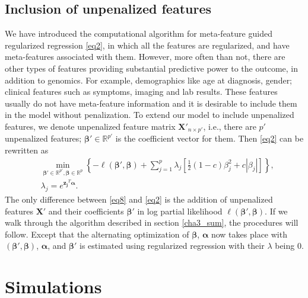 \subsection{Inclusion of unpenalized features}
We have introduced the computational algorithm for meta-feature guided regularized regression \eqref{eq2}, in which all the features are regularized, and have meta-features associated with them. However, more often than not, there are other types of features providing substantial predictive power to the outcome, in addition to genomics. For example, demographics like age at diagnosis, gender; clinical features such as symptoms, imaging and lab results. These features usually do not have meta-feature information and it is desirable to include them in the model without penalization. To extend our model to include unpenalized features, we denote unpenalized feature matrix $\bm{X}'_{n\times p'}$, i.e., there are $p'$ unpenalized features; $\bm{\beta}'\in \mathbb{R}^{p'}$ is the coefficient vector for them. Then \eqref{eq2} can be rewritten as
\begin{equation} \label{eq8}
\begin{aligned}
    &\min_{\bm{\beta}'\in \mathbb{R}^{p'}, \bm{\beta}\in \mathbb{R}^p} \left\{-\ell(\bm{\beta}', \bm{\beta}) + \sum_{j=1}^p \lambda_j\left[\frac{1}{2}(1-c)\beta_j^2 + c|\beta_j|\right]\right\}, \\
    &\lambda_j = e^{\bm{z_j}^T \bm{\alpha}}.
\end{aligned}
\end{equation}
The only difference between \eqref{eq8} and \eqref{eq2} is the addition of unpenalized features $\bm{X}'$ and their coefficients $\bm{\beta}'$ in log partial likelihood $\ell(\bm{\beta}', \bm{\beta})$. If we walk through the algorithm described in section \ref{cha3_sum}, the procedures will follow. Except that the alternating optimization of $\bm{\beta}$, $\bm{\alpha}$ now takes place with $(\bm{\beta}', \bm{\beta})$, $\bm{\alpha}$, and $\bm{\beta}'$ is estimated using regularized regression with their $\lambda$ being 0.

\section{Simulations}
